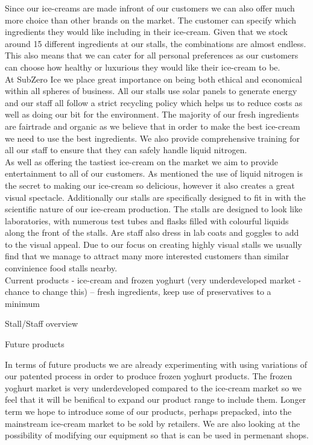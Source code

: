 \documentclass{article}
\begin{document}
Since our ice-creams are made infront of our customers we can also offer much more choice than other brands on the market. The customer can specify which ingredients they would like including in their ice-cream. Given that we stock around 15 different ingredients at our stalls, the combinations are almost endless. This also means that we can cater for all personal preferences as our customers can choose how healthy or luxurious they would like their ice-cream to be. \\

At SubZero Ice we place great importance on being both ethical and economical within all spheres of business. All our stalls use solar panels to generate energy and our staff all follow a strict recycling policy which helps us to reduce costs as well as doing our bit for the environment. The majority of our fresh ingredients are fairtrade and organic as we believe that in order to make the best ice-cream we need to use the best ingredients. We also provide comprehensive training for all our staff to ensure that they can safely handle liquid nitrogen. \\

As well as offering the tastiest ice-cream on the market we aim to provide entertainment to all of our customers. As mentioned the use of liquid nitrogen is the secret to making our ice-cream so delicious, however it also creates a great visual spectacle. Additionally our stalls are specifically designed to fit in with the scientific nature of our ice-cream production. The stalls are designed to look like laboratories, with numerous test tubes and flasks filled with colourful liquids along the front of the stalls. Are staff also dress in lab coats and goggles to add to the visual appeal. Due to our focus on creating highly visual stalls we usually find that we manage to attract many more interested customers than similar convinience food stalls nearby. \\
  
%
  Current products - ice-cream and frozen yoghurt (very underdeveloped market - chance to change this)
    -- fresh ingredients, keep use of preservatives to a minimum

  Stall/Staff overview

  Future products
%

In terms of future products we are already experimenting with using variations of our patented process in order to produce frozen yoghurt products. The frozen yoghurt market is very underdeveloped compared to the ice-cream market so we feel that it will be benifical to expand our product range to include them. Longer term we hope to introduce some of our products, perhaps prepacked, into the mainstream ice-cream market to be sold by retailers. We are also looking at the possibility of modifying our equipment so that is can be used in permenant shops.
\end{document}
